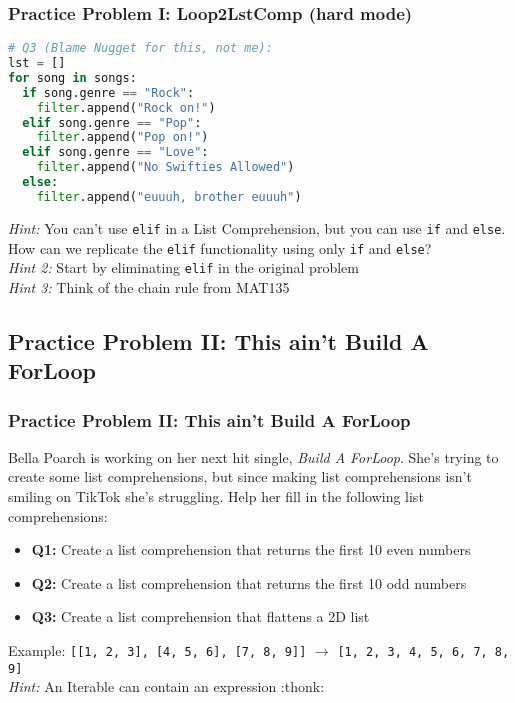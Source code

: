 \documentclass[hyperref={colorlinks,citecolor=blue,linkcolor=blue,urlcolor=blue}]{beamer}
\begin{document}
\begin{frame}[fragile]
  \frametitle{Practice Problem I: Loop2LstComp (hard mode)}
  \begin{lstlisting}[language=Python, style=mystyle]
# Q3 (Blame Nugget for this, not me):
lst = []
for song in songs:
  if song.genre == "Rock":
    filter.append("Rock on!")
  elif song.genre == "Pop":
    filter.append("Pop on!")
  elif song.genre == "Love":
    filter.append("No Swifties Allowed")
  else:
    filter.append("euuuh, brother euuuh")
    \end{lstlisting}
\textit{Hint:} You can't use \texttt{elif} in a List Comprehension, but you can use \texttt{if} and \texttt{else}. How can we replicate the \texttt{elif} functionality using only \texttt{if} and \texttt{else}?\\
\textit{Hint 2:} Start by eliminating \texttt{elif} in the original problem\\
\textit{Hint 3:} Think of the chain rule from MAT135
\end{frame}



\subsection{Practice Problem II: This ain't Build A ForLoop}
\begin{frame}
  \frametitle{Practice Problem II: This ain't Build A ForLoop}
  Bella Poarch is working on her next hit single, \textit{Build A ForLoop}. She's trying to create some list comprehensions, but since making list comprehensions isn't smiling on TikTok she's struggling. Help her fill in the following list comprehensions:
  
  \begin{itemize}
    \item \textbf{Q1:} Create a list comprehension that returns the first 10 even numbers
    \item \textbf{Q2:} Create a list comprehension that returns the first 10 odd numbers
    \item \textbf{Q3:} Create a list comprehension that flattens a 2D list
  \end{itemize}
  Example:
  \texttt{[[1, 2, 3], [4, 5, 6], [7, 8, 9]]} $\rightarrow$ \texttt{[1, 2, 3, 4, 5, 6, 7, 8, 9]}\\
  \textit{Hint:} An Iterable can contain an expression :thonk:

\end{frame}
\end{document}
